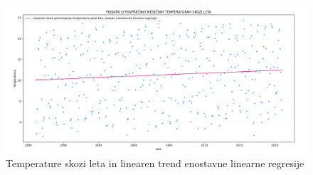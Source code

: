 \documentclass{article}
\begin{document}
\begin{figure}[H]
    \begin{center}
    \includegraphics[width=\linewidth]{naloga3a.png}
    \vspace*{-5mm}\caption{Temperature skozi leta in linearen trend enostavne linearne regresije}
    \end{center}    
\end{figure}
\end{document}

